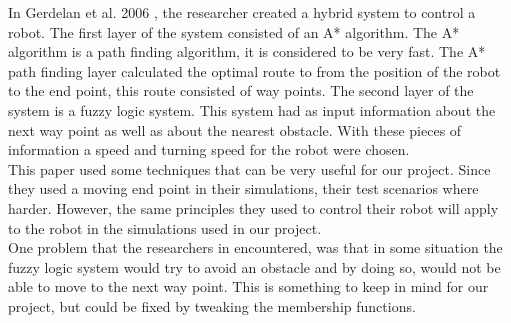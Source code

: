 \documentclass[conference]{IEEEtran}
\begin{document}
In Gerdelan et al. 2006 \cite{gerdelan2006novel}, the researcher created a hybrid system to control a robot. The first layer of the system consisted of an A* algorithm. The A* algorithm is a path finding algorithm, it is considered to be very fast. The A* path finding layer calculated the optimal route to from the position of the robot to the end point, this route consisted of way points. The second layer of the system is a fuzzy logic system. This system had as input information about the next way point as well as about the nearest obstacle. With these pieces of information a speed and turning speed for the robot were chosen.\\
This paper used some techniques that can be very useful for our project. Since they used a moving end point in their simulations, their test scenarios where harder. However, the same principles they used to control their robot will apply to the robot in the simulations used in our project.\\
One problem that the researchers in \cite{gerdelan2006novel} encountered, was that in some situation the fuzzy logic system would try to avoid an obstacle and by doing so, would not be able to move to the next way point. This is something to keep in mind for our project, but could be fixed by tweaking the membership functions.
\end{document}
